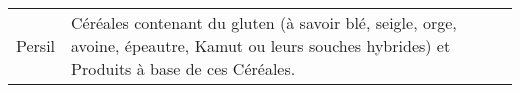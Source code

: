 \begin{tabular}{p{7cm}p{7cm}}
                                                                                                                                                                                                                                                                                                                                                                                                                                                                       Persil &                                                                                                                                                                                                                                                                                                                                                                                                                                                                                                                                                                                                                                                                                                                                                                                                                                                                                                                                                                                                                                                                                                                                                                                                                                                                                      Céréales contenant du gluten (à savoir blé, seigle, orge, avoine, épeautre, Kamut ou leurs souches hybrides) \newline et Produits à base de ces Céréales. \\

\end{tabular}
